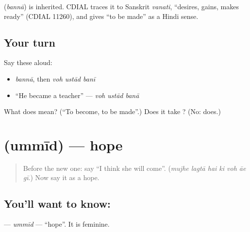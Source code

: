 \begin{cousinweb}
\textbf{} (\emph{bannā}) is inherited. CDIAL traces it to Sanskrit \emph{vanati}, \textquotedblleft{}desires, gains, makes ready\textquotedblright{} (CDIAL 11260), and gives \textquotedblleft{}to be made\textquotedblright{} as a Hindi sense.
\end{cousinweb}

\subsection*{Your turn}
Say these aloud:

\begin{itemize}
\raggedright
  \item \emph{bannā}, then \emph{voh ustād banī}
  \item \textquotedblleft{}He became a teacher\textquotedblright{} — \emph{voh ustād banā}
\end{itemize}

\begin{tcolorbox}[breakable,colback=teal!4,colframe=teal!35!black,title={Before you move on}]
What does \textbf{} mean? (\textquotedblleft{}To become, to be made\textquotedblright{}.) Does it take \textbf{}? (No: \textbf{} does.)
\end{tcolorbox}
\section[\texorpdfstring{\ur{امید} (ummīd)}{امید (ummīd)}]{ (ummīd) — hope}

\label{lesson:UR-C272-ummid}



\begin{quote}
Before the new one: say \textquotedblleft{}I think she will come\textquotedblright{}. (\emph{mujhe lagtā hai ki voh āe gī}.) Now say it as a hope.
\end{quote}

\subsection*{You'll want to know: }
\textbf{} — \emph{ummīd} — \textquotedblleft{}hope\textquotedblright{}. It is feminine.

\begin{quote}
\textbf{  }
\end{quote}

